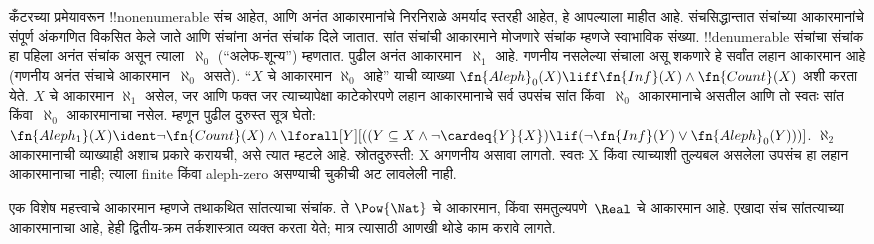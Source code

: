 \documentclass[../../../include/open-logic-section]{subfiles}
\begin{document}
कँटरच्या प्रमेयावरून !!{nonenumerable} संच आहेत,
आणि अनंत आकारमानांचे निरनिराळे अमर्याद स्तरही
आहेत, हे आपल्याला माहीत आहे. संचसिद्धान्तात
संचांच्या आकारमानांचे संपूर्ण अंकगणित विकसित केले
जाते आणि संचांना अनंत संचांक दिले जातात. सांत
संचांची आकारमाने मोजणारे संचांक म्हणजे स्वाभाविक
संख्या. !!{denumerable} संचांचा संचांक हा पहिला
अनंत संचांक असून त्याला~$\aleph_0$ (``अलेफ-शून्य'')
म्हणतात. पुढील अनंत आकारमान~$\aleph_1$ आहे.
गणनीय नसलेल्या संचाला असू शकणारे हे
सर्वांत लहान आकारमान आहे (गणनीय अनंत संचाचे
आकारमान~$\aleph_0$ असते). ``$X$ चे आकारमान
$\aleph_0$ आहे'' याची व्याख्या
$\fn{Aleph}_0(X) \liff \fn{Inf}(X) \land \fn{Count}(X)$
अशी करता येते. $X$ चे आकारमान $\aleph_1$
असेल, जर आणि फक्त जर त्याच्यापेक्षा काटेकोरपणे लहान
आकारमानाचे सर्व उपसंच सांत किंवा~$\aleph_0$ आकारमानाचे
असतील आणि तो स्वतः सांत किंवा~$\aleph_0$ आकारमानाचा
नसेल. म्हणून पुढील दुरुस्त सूत्र घेतो:
$\fn{Aleph_1}(X) \ident \lnot\fn{Count}(X) \land
\lforall[Y][((Y \subseteq X \land \lnot\cardeq{Y}{X}) \lif
  (\lnot\fn{Inf}(Y) \lor \fn{Aleph}_0(Y)))]$. $\aleph_2$ आकारमानाची
व्याख्याही अशाच प्रकारे करायची, असे त्यात म्हटले आहे.
स्रोतदुरुस्ती: X अगणनीय असावा लागतो. स्वतः X किंवा
त्याच्याशी तुल्यबल असलेला उपसंच हा लहान आकारमानाचा नाही;
त्याला finite किंवा aleph-zero असण्याची चुकीची अट लावलेली नाही.

एक विशेष महत्त्वाचे आकारमान म्हणजे तथाकथित
सांतत्याचा संचांक. ते $\Pow{\Nat}$ चे आकारमान,
किंवा समतुल्यपणे~$\Real$ चे आकारमान आहे.
एखादा संच सांतत्याच्या आकारमानाचा आहे, हेही
द्वितीय-क्रम तर्कशास्त्रात व्यक्त करता येते; मात्र
त्यासाठी आणखी थोडे काम करावे लागते.
\end{document}
